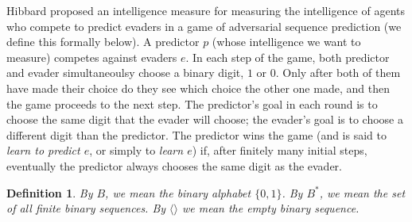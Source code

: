 \documentclass{article}
\newtheorem{definition}[theorem]{Definition}
\begin{document}
Hibbard proposed an intelligence measure for measuring the intelligence
of agents who compete to predict evaders in a game of
adversarial sequence prediction (we define this
formally below). A predictor $p$ (whose intelligence we want to measure)
competes against evaders $e$. In each step of the game,
both predictor and evader simultaneoulsy choose a binary digit, $1$ or $0$.
Only after both of them have made their choice do they see which choice the other
one made, and then the game proceeds to the next step. The predictor's goal in
each round is to choose the same digit that the evader will choose;
the evader's goal is to choose a different digit than the predictor. The predictor
wins the game (and is said to \emph{learn to predict $e$}, or simply to
\emph{learn $e$}) if, after finitely many
initial steps, eventually the predictor always chooses the same digit as the
evader.

\begin{definition}
By $B$, we mean the binary alphabet $\{0,1\}$. By $B^*$, we mean the set of all
finite binary sequences. By $\langle\rangle$ we mean the empty binary sequence.
\end{definition}
\end{document}
